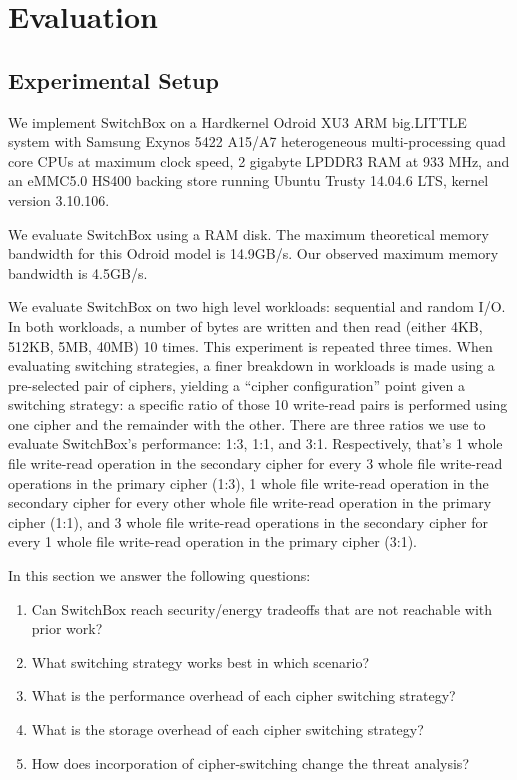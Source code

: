 \section{Evaluation}\label{sec:evaluation}

\subsection{Experimental Setup}

We implement SwitchBox on a Hardkernel Odroid XU3 ARM big.LITTLE system with
Samsung Exynos 5422 A15/A7 heterogeneous multi-processing quad core CPUs at
maximum clock speed, 2 gigabyte LPDDR3 RAM at 933 MHz, and an eMMC5.0 HS400
backing store running Ubuntu Trusty 14.04.6 LTS, kernel version 3.10.106.

We evaluate SwitchBox using a RAM disk. The maximum theoretical memory bandwidth
for this Odroid model is 14.9GB/s\@. Our observed maximum memory bandwidth is
4.5GB/s.

We evaluate SwitchBox on two high level workloads: sequential and random I/O. In
both workloads, a number of bytes are written and then read (either 4KB, 512KB,
5MB, 40MB) 10 times. This experiment is repeated three times. When evaluating
switching strategies, a finer breakdown in workloads is made using a
pre-selected pair of ciphers, yielding a ``cipher configuration'' point given a
switching strategy: a specific ratio of those 10 write-read pairs is performed
using one cipher and the remainder with the other. There are three ratios we use
to evaluate SwitchBox's performance: 1:3, 1:1, and 3:1. Respectively, that's 1
whole file write-read operation in the secondary cipher for every 3 whole file
write-read operations in the primary cipher (1:3), 1 whole file write-read
operation in the secondary cipher for every other whole file write-read
operation in the primary cipher (1:1), and 3 whole file write-read operations in
the secondary cipher for every 1 whole file write-read operation in the primary
cipher (3:1).

In this section we answer the following questions:
\begin{enumerate}
 \item Can SwitchBox reach security/energy tradeoffs that are not reachable with prior work?
 \item What switching strategy works best in which scenario?
 \item What is the performance overhead of each cipher switching strategy?
 \item What is the storage overhead of each cipher switching strategy?
 \item How does incorporation of cipher-switching change the threat analysis?
\end{enumerate}

